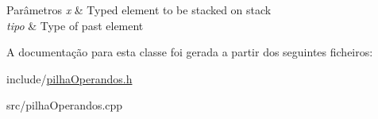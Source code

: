 \begin{DoxyParams}{Parâmetros}
{\em x} & Typed element to be stacked on stack \\
\hline
{\em tipo} & Type of past element \\
\hline
\end{DoxyParams}


A documentação para esta classe foi gerada a partir dos seguintes ficheiros\+:\begin{DoxyCompactItemize}
\item 
include/\hyperlink{pilhaOperandos_8h}{pilha\+Operandos.\+h}\item 
src/pilha\+Operandos.\+cpp\end{DoxyCompactItemize}
